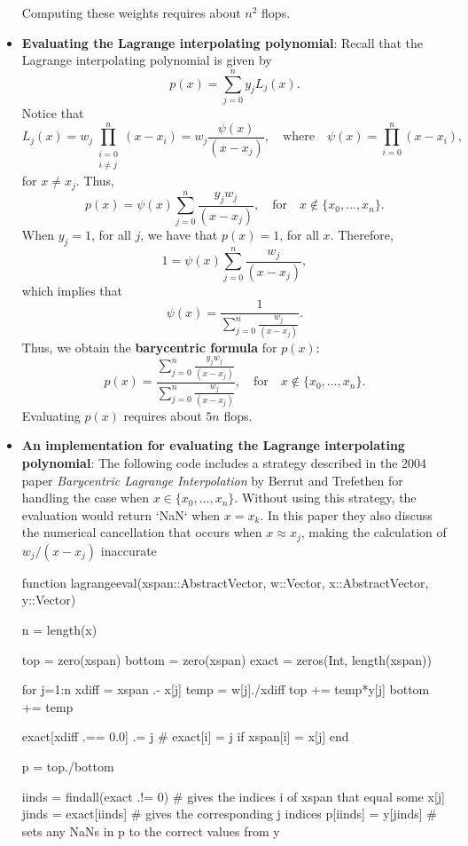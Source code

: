 \documentclass{report}
\begin{document}
\begin{itemize}
    Computing these weights requires about $n^2$ flops.
\item \textbf{Evaluating the Lagrange interpolating polynomial}:
    Recall that the Lagrange interpolating polynomial is given by
    $$p(x) = \sum_{j=0}^n y_j L_j(x).$$
    Notice that
    $$L_j(x) = w_j \prod_{\substack{i = 0 \\ i \neq j}}^n (x-x_i) = w_j \frac{\psi(x)}{(x-x_j)},
    \quad \text{where} \quad \psi(x) = \prod_{i=0}^n (x-x_i),$$
    for $x \neq x_j$. Thus,
    $$p(x) = \psi(x) \sum_{j=0}^n  \frac{y_j w_j}{(x-x_j)}, \quad \text{for} \quad x \not\in \{x_0, \ldots, x_n\}.$$
    \bigbreak \noindent 
    When $y_j = 1$, for all $j$, we have that $p(x) = 1$, for all $x$. Therefore,
    $$1 = \psi(x) \sum_{j=0}^n  \frac{w_j}{(x-x_j)},$$
    which implies that
    $$\psi(x) = \frac{1}{\sum_{j=0}^n  \frac{w_j}{(x-x_j)}}.$$
    Thus, we obtain the \textbf{barycentric formula} for $p(x)$:
    $$p(x) = \frac{\sum_{j=0}^n  \frac{y_j w_j}{(x-x_j)}}{\sum_{j=0}^n  \frac{w_j}{(x-x_j)}}, 
    \quad \text{for} \quad x \not\in \{x_0, \ldots, x_n\}.$$
    Evaluating $p(x)$ requires about $5n$ flops.
\item \textbf{An implementation for evaluating the Lagrange interpolating polynomial}:
    The following code includes a strategy described in the 2004 paper \textit{Barycentric Lagrange Interpolation}
    by Berrut and Trefethen for handling the case when $x \in \{x_0, \ldots, x_n\}$. Without using this strategy, the evaluation would return `NaN` when $x = x_k$.
    \bigbreak \noindent 
    In this paper they also discuss the numerical cancellation that occurs when $x \approx x_j$, making the calculation of $w_j/(x-x_j)$ inaccurate
    \bigbreak \noindent 
    \begin{jlcode}
function lagrangeeval(xspan::AbstractVector, w::Vector, x::AbstractVector, y::Vector)
    
    n = length(x)
    
    top = zero(xspan)
    bottom = zero(xspan)
    exact = zeros(Int, length(xspan))

    for j=1:n
        xdiff = xspan .- x[j]
        temp = w[j]./xdiff
        top += temp*y[j]
        bottom += temp
        
        exact[xdiff .== 0.0] .= j  # exact[i] = j if xspan[i] = x[j]
    end
    
    p = top./bottom

    iinds = findall(exact .!= 0)  # gives the indices i of xspan that equal some x[j]
    jinds = exact[iinds]          # gives the corresponding j indices
    p[iinds] = y[jinds]           # sets any NaNs in p to the correct values from y
    

\end{jlcode}
\end{itemize}
\end{document}
